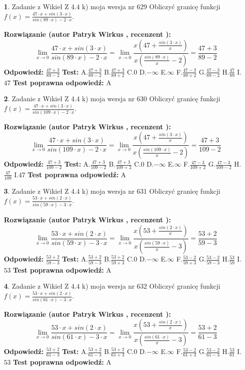 \documentclass[12pt, a4paper]{article}
\theoremstyle{definition} %
\newtheorem{zad}{}
\newcommand{\zadStart}[1]{\begin{zad}#1\newline}
\newcommand{\zadStop}{\end{zad}}
\newcommand{\rozwStart}[2]{\noindent \textbf{Rozwiązanie (autor #1 , recenzent #2): }\newline}
\newcommand{\rozwStop}{\newline}
\newcommand{\odpStart}{\noindent \textbf{Odpowiedź:}\newline}
\newcommand{\odpStop}{\newline}
\newcommand{\testStart}{\noindent \textbf{Test:}\newline}
\newcommand{\testStop}{\newline}
\newcommand{\kluczStart}{\noindent \textbf{Test poprawna odpowiedź:}\newline}
\newcommand{\kluczStop}{\newline}
\begin{document}
\zadStart{Zadanie z Wikieł Z 4.4 k) moja wersja nr 629}
Obliczyć granicę funkcji $f(x)=\frac{47\cdot x +sin(3\cdot x)}{sin(89\cdot x) -2\cdot x}$.
\zadStop
\rozwStart{Patryk Wirkus}{}
$$\lim\limits_{x\to 0}\frac{47\cdot x +sin(3\cdot x)}{sin(89\cdot x) -2\cdot x}
=\lim\limits_{x\to 0}\frac{x(47+\frac{sin(3\cdot x)}{x})}{x(\frac{sin(89\cdot x)}{x}-2)}
=\frac{47+3}{89-2}$$
\rozwStop
\odpStart
$\frac{47+3}{89-2}$
\odpStop
\testStart
A.$\frac{47+3}{89-2}$
B.$\frac{47+3}{89+2}$
C.$0$
D.$-\infty$
E.$\infty$
F.$\frac{47-3}{89+2}$
G.$\frac{47-3}{89-2}$
H.$\frac{47}{89}$
I.$47$
\testStop
\kluczStart
A
\kluczStop



\zadStart{Zadanie z Wikieł Z 4.4 k) moja wersja nr 630}
Obliczyć granicę funkcji $f(x)=\frac{47\cdot x +sin(3\cdot x)}{sin(109\cdot x) -2\cdot x}$.
\zadStop
\rozwStart{Patryk Wirkus}{}
$$\lim\limits_{x\to 0}\frac{47\cdot x +sin(3\cdot x)}{sin(109\cdot x) -2\cdot x}
=\lim\limits_{x\to 0}\frac{x(47+\frac{sin(3\cdot x)}{x})}{x(\frac{sin(109\cdot x)}{x}-2)}
=\frac{47+3}{109-2}$$
\rozwStop
\odpStart
$\frac{47+3}{109-2}$
\odpStop
\testStart
A.$\frac{47+3}{109-2}$
B.$\frac{47+3}{109+2}$
C.$0$
D.$-\infty$
E.$\infty$
F.$\frac{47-3}{109+2}$
G.$\frac{47-3}{109-2}$
H.$\frac{47}{109}$
I.$47$
\testStop
\kluczStart
A
\kluczStop



\zadStart{Zadanie z Wikieł Z 4.4 k) moja wersja nr 631}
Obliczyć granicę funkcji $f(x)=\frac{53\cdot x +sin(2\cdot x)}{sin(59\cdot x) -3\cdot x}$.
\zadStop
\rozwStart{Patryk Wirkus}{}
$$\lim\limits_{x\to 0}\frac{53\cdot x +sin(2\cdot x)}{sin(59\cdot x) -3\cdot x}
=\lim\limits_{x\to 0}\frac{x(53+\frac{sin(2\cdot x)}{x})}{x(\frac{sin(59\cdot x)}{x}-3)}
=\frac{53+2}{59-3}$$
\rozwStop
\odpStart
$\frac{53+2}{59-3}$
\odpStop
\testStart
A.$\frac{53+2}{59-3}$
B.$\frac{53+2}{59+3}$
C.$0$
D.$-\infty$
E.$\infty$
F.$\frac{53-2}{59+3}$
G.$\frac{53-2}{59-3}$
H.$\frac{53}{59}$
I.$53$
\testStop
\kluczStart
A
\kluczStop



\zadStart{Zadanie z Wikieł Z 4.4 k) moja wersja nr 632}
Obliczyć granicę funkcji $f(x)=\frac{53\cdot x +sin(2\cdot x)}{sin(61\cdot x) -3\cdot x}$.
\zadStop
\rozwStart{Patryk Wirkus}{}
$$\lim\limits_{x\to 0}\frac{53\cdot x +sin(2\cdot x)}{sin(61\cdot x) -3\cdot x}
=\lim\limits_{x\to 0}\frac{x(53+\frac{sin(2\cdot x)}{x})}{x(\frac{sin(61\cdot x)}{x}-3)}
=\frac{53+2}{61-3}$$
\rozwStop
\odpStart
$\frac{53+2}{61-3}$
\odpStop
\testStart
A.$\frac{53+2}{61-3}$
B.$\frac{53+2}{61+3}$
C.$0$
D.$-\infty$
E.$\infty$
F.$\frac{53-2}{61+3}$
G.$\frac{53-2}{61-3}$
H.$\frac{53}{61}$
I.$53$
\testStop
\kluczStart
A
\kluczStop
\end{document}
